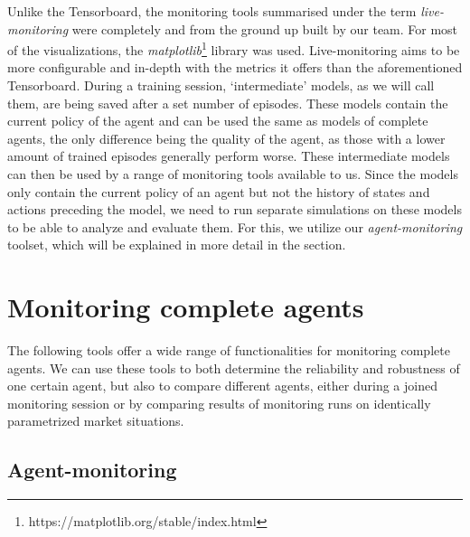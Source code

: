 Unlike the Tensorboard, the monitoring tools summarised under the term \emph{live-monitoring} were completely and from the ground up built by our team. For most of the visualizations, the \emph{matplotlib}\footnote[0][-0.2]{https://matplotlib.org/stable/index.html} library was used. Live-monitoring aims to be more configurable and in-depth with the metrics it offers than the aforementioned Tensorboard.  During a training session, `intermediate' models, as we will call them, are being saved after a set number of episodes.  These models contain the current policy of the agent and can be used the same as models of complete agents, the only difference being the quality of the agent, as those with a lower amount of trained episodes generally perform worse.  These intermediate models can then be used by a range of monitoring tools available to us. Since the models only contain the current policy of an agent but not the history of states and actions preceding the model, we need to run separate simulations on these models to be able to analyze and evaluate them. For this, we utilize our \emph{agent-monitoring} toolset, which will be explained in more detail in the  section.

\section{Monitoring complete agents}\label{sec:CompleteAgents}

The following tools offer a wide range of functionalities for monitoring complete agents. We can use these tools to both determine the reliability and robustness of one certain agent, but also to compare different agents, either during a joined monitoring session or by comparing results of monitoring runs on identically parametrized market situations.

\subsection*{Agent-monitoring}\label{subsec:AgentMonitoring}


